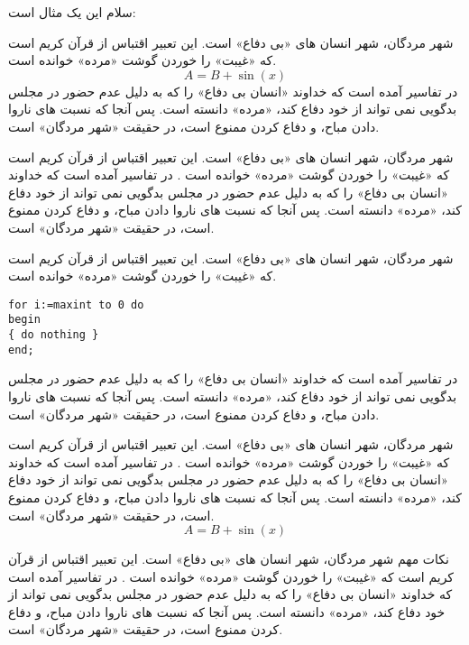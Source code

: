 \documentclass{Boostan-UserManual}
\begin{document}
سلام این یک مثال است:

\begin{note}
شهر مردگان، شهر انسان های «بی دفاع» است. این تعبیر اقتباس از قرآن کریم است که «غیبت» را خوردن گوشت «مرده» خوانده است. 
\begin{equation}
A = B + \sin (x)
\end{equation}
در تفاسیر آمده است که خداوند «انسان بی دفاع» را که به دلیل عدم حضور در مجلس بدگویی نمی تواند از خود دفاع کند، «مرده» دانسته است. پس آنجا که نسبت های ناروا دادن مباح، و دفاع کردن ممنوع است، در حقیقت «شهر مردگان» است.
\end{note}

\begin{problem}
شهر مردگان، شهر انسان های «بی دفاع» است. این تعبیر اقتباس از قرآن کریم است که «غیبت» را خوردن گوشت «مرده» خوانده است . در تفاسیر آمده است که خداوند «انسان بی دفاع» را که به دلیل عدم حضور در مجلس بدگویی نمی تواند از خود دفاع کند، «مرده» دانسته است. پس آنجا که نسبت های ناروا دادن مباح، و دفاع کردن ممنوع است، در حقیقت «شهر مردگان» است.


\end{problem}


\begin{refer}
شهر مردگان، شهر انسان های «بی دفاع» است. این تعبیر اقتباس از قرآن کریم است که «غیبت» را خوردن گوشت «مرده» خوانده است.
\begin{latin}
\lstset{numbers=none,frame=none}
\begin{lstlisting}
for i:=maxint to 0 do
begin
{ do nothing }
end;
\end{lstlisting}
\end{latin}
  در تفاسیر آمده است که خداوند «انسان بی دفاع» را که به دلیل عدم حضور در مجلس بدگویی نمی تواند از خود دفاع کند، «مرده» دانسته است. پس آنجا که نسبت های ناروا دادن مباح، و دفاع کردن ممنوع است، در حقیقت «شهر مردگان» است.
\end{refer}

\begin{info}
شهر مردگان، شهر انسان های «بی دفاع» است. این تعبیر اقتباس از قرآن کریم است که «غیبت» را خوردن گوشت «مرده» خوانده است . 
در تفاسیر آمده است که خداوند «انسان بی دفاع» را که به دلیل عدم حضور در مجلس بدگویی نمی تواند از خود دفاع کند، «مرده» دانسته است. پس آنجا که نسبت های ناروا دادن مباح، و دفاع کردن ممنوع است، در حقیقت «شهر مردگان» است.
\begin{equation}
A = B + \sin (x)
\end{equation}
\end{info}

\begin{warning}{نکات مهم}
شهر مردگان، شهر انسان های «بی دفاع» است. این تعبیر اقتباس از قرآن کریم است که «غیبت» را خوردن گوشت «مرده» خوانده است . در تفاسیر آمده است که خداوند «انسان بی دفاع» را که به دلیل عدم حضور در مجلس بدگویی نمی تواند از خود دفاع کند، «مرده» دانسته است. پس آنجا که نسبت های ناروا دادن مباح، و دفاع کردن ممنوع است، در حقیقت «شهر مردگان» است.
\end{warning}
\end{document}
